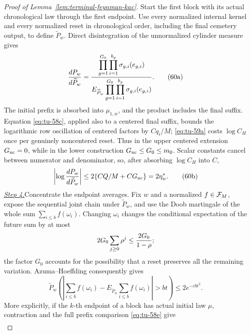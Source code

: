 \begin{proof}[Proof of Lemma~\ref{lem:terminal-feynman-kac}]
Start the first block with its actual chronological law through the first
endpoint.  Use every normalized internal kernel and every normalized reset
in chronological order, including the final cemetery output, to define
\(\widetilde P_w\).  Direct disintegration of the unnormalized cylinder
measure gives
\begin{equation}
 {dP_w\over d\widetilde P_w}
 ={\displaystyle\prod_{g=1}^{G_0}\prod_{i=1}^{b_g}
          \sigma_{g,i}(e_{g,i})\over
   \displaystyle E_{\widetilde P_w}
       \prod_{g=1}^{G_0}\prod_{i=1}^{b_g}
          \sigma_{g,i}(e_{g,i})}.                           \tag{60a}\label{eq:tu-60a}
\end{equation}
The initial prefix is absorbed into \(\mu_{1,w}\), and the product
includes the final suffix. Equation \eqref{eq:tu-58c}, applied also to a centered final suffix, bounds the
logarithmic row oscillation of centered factors by \(Cq_i/M\); \eqref{eq:tu-59a} costs
\(\log C_H\) once per genuinely noncentered reset.  Thus in the upper
centered extension \(G_{\rm nc}=0\), while in the lower construction
\(G_{\rm nc}\le G_0\le m_0\).  Scalar
constants cancel between numerator and denominator, so, after absorbing
\(\log C_H\) into \(C\),
\begin{equation}
 \left|\log{dP_w\over d\widetilde P_w}\right|
 \le2\{CQ/M+CG_{\rm nc}\}=2\eta_w^*.                       \tag{60b}\label{eq:tu-60b}
\end{equation}
\smallskip\noindent
\underline{\textit{Step 4.}}\quad Concentrate the endpoint averages.
Fix \(w\) and a normalized
\(f\in{\cal F}_M\), expose the sequential joint chain under
\(\widetilde P_w\), and use the Doob martingale of
the whole sum \(\sum_{i\le b}f(\omega_i)\).  Changing \(\omega_i\) changes the
conditional expectation of the future sum by at most
\[
       2G_0\sum_{j\ge0}\rho^j\le {2G_0\over1-\rho};
\]
the factor \(G_0\) accounts for the possibility that a reset preserves
all the remaining variation.
Azuma--Hoeffding consequently gives
\begin{equation}
 \widetilde P_w\left(\left|\sum_{i\le b}f(\omega_i)
       -E_{\widetilde P_w}\sum_{i\le b}f(\omega_i)\right|>bt\right)
 \le2e^{-cbt^2}.                                             \tag{61}\label{eq:tu-61}
\end{equation}
More explicitly, if the \(k\)-th endpoint of a block has actual initial
law \(\mu\), contraction and the full prefix comparison \eqref{eq:tu-58e} give
\begin{equation}
\begin{split}

\end{split}
\end{equation}
\end{proof}
